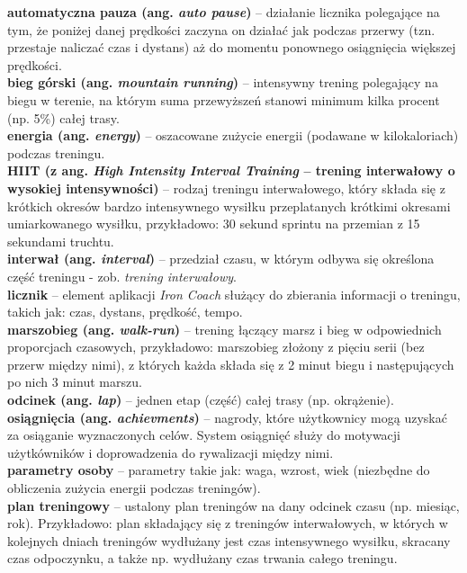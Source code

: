 

\newcommand{\dicen}[1]{
  \indent\textbf{#1}
}



	\noindent\dicen{automatyczna pauza (ang. \textit{auto pause})}-- działanie licznika polegające na tym, że poniżej danej prędkości zaczyna on działać jak podczas przerwy (tzn. przestaje naliczać czas i dystans) aż do momentu ponownego osiągnięcia większej prędkości.\\
	\dicen{bieg górski (ang. \textit{mountain running})}-- intensywny trening polegający na biegu w terenie, na którym suma przewyższeń stanowi minimum kilka procent (np. 5\%) całej trasy.\\
	\dicen{energia (ang. \textit{energy})}-- oszacowane zużycie energii (podawane w kilokaloriach) podczas treningu.\\
	\dicen{HIIT (z ang. \textit{High Intensity Interval Training} -- trening interwałowy o wysokiej intensywności)}-- rodzaj treningu interwałowego, który składa się z krótkich okresów bardzo intensywnego wysiłku przeplatanych krótkimi okresami umiarkowanego wysiłku, przykładowo: 30 sekund sprintu na przemian z 15 sekundami truchtu.\\
	\dicen{interwał (ang. \textit{interval})}-- przedział czasu, w którym odbywa się określona część treningu - zob. \textit{trening interwałowy}.\\
	\dicen{licznik}-- element aplikacji \textit{Iron Coach} służący do zbierania informacji o treningu, takich jak: czas, dystans, prędkość, tempo.\\
	\dicen{marszobieg (ang. \textit{walk-run})}-- trening łączący marsz i bieg w odpowiednich proporcjach czasowych, przykładowo: marszobieg złożony z pięciu serii (bez przerw między nimi), z których każda składa się z 2 minut biegu i następujących po nich 3 minut marszu.\\
	\dicen{odcinek (ang. \textit{lap})}-- jednen etap (część) całej trasy (np. okrążenie).\\
	\dicen{osiągnięcia (ang. \textit{achievments})}-- nagrody, które użytkownicy mogą uzyskać za osiąganie wyznaczonych celów. System osiągnięć służy do motywacji użytkówników i doprowadzenia do rywalizacji między nimi.\\
	\dicen{parametry osoby}-- parametry takie jak: waga, wzrost, wiek (niezbędne do obliczenia zużycia energii podczas treningów).\\
	\dicen{plan treningowy}-- ustalony plan treningów na dany odcinek czasu (np. miesiąc, rok). Przykładowo: plan składający się z treningów interwałowych, w których w kolejnych dniach treningów wydłużany jest czas intensywnego wysiłku, skracany czas odpoczynku, a także np. wydłużany czas trwania całego treningu.\\
